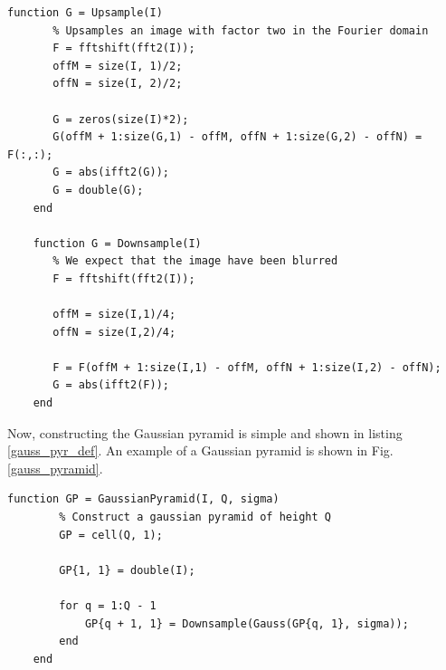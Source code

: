 \documentclass[a4paper, 10pt, final]{article}
\begin{document}
\begin{lstlisting}[caption={Up- and down-sampling of an image in the
    frequency domain. Images have a size as an exponential of 2 and they
    are expected to be blurred before downsampling (to avoid ringin). In
    short, upsampling just pad the frequency representation with zeroes
    thus enlarging the image, while downsampling cuts out a smaller box
    in from the center of the frequency representation, thus decreasing
    the size of the image.}, captionpos=b,
    label={sample_matlab}, float=b, numbers=none]
    function G = Upsample(I)
       % Upsamples an image with factor two in the Fourier domain
       F = fftshift(fft2(I));
       offM = size(I, 1)/2;
       offN = size(I, 2)/2;
       
       G = zeros(size(I)*2);
       G(offM + 1:size(G,1) - offM, offN + 1:size(G,2) - offN) = F(:,:);
       G = abs(ifft2(G));
       G = double(G);
    end

    function G = Downsample(I)
       % We expect that the image have been blurred
       F = fftshift(fft2(I));
       
       offM = size(I,1)/4;
       offN = size(I,2)/4;
       
       F = F(offM + 1:size(I,1) - offM, offN + 1:size(I,2) - offN);
       G = abs(ifft2(F));
    end
\end{lstlisting}

Now, constructing the Gaussian pyramid is simple and shown in listing
\ref{gauss_pyr_def}. An example of a Gaussian pyramid is shown in Fig.
\ref{gauss_pyramid}.

\begin{lstlisting}[caption={Construction of the gaussian pyramid using
    Eq. \eqref{gauss_pyr_def}. $Q$ is the number of levels in the
    pyramid. We use the methods from listings \ref{gauss_matlab} and
    \ref{sample_matlab}. The resulting pyramid --- or sequence of images
    --- is put in the cell structure in MATLAB.}, captionpos=b,
    label={gauss_pyr_matlab}, float=h, numbers=none]
    function GP = GaussianPyramid(I, Q, sigma)
        % Construct a gaussian pyramid of height Q
        GP = cell(Q, 1);
                
        GP{1, 1} = double(I);
        
        for q = 1:Q - 1
            GP{q + 1, 1} = Downsample(Gauss(GP{q, 1}, sigma));
        end
    end
\end{lstlisting}
\end{document}
